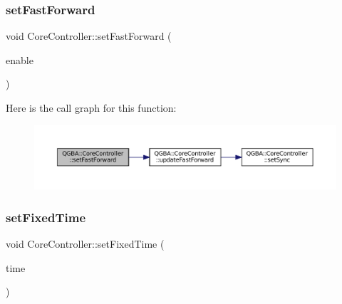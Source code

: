 \mbox{\label{class_q_g_b_a_1_1_core_controller_a44bec31b90546780c11957242878af56}} 
\subsubsection{\texorpdfstring{set\+Fast\+Forward}{setFastForward}}
{\footnotesize\ttfamily void Core\+Controller\+::set\+Fast\+Forward (\begin{DoxyParamCaption}\item[{\mbox{\hyperlink{libretro_8h_a4a26dcae73fb7e1528214a068aca317e}{bool}}}]{enable }\end{DoxyParamCaption})\hspace{0.3cm}{\ttfamily [slot]}}

Here is the call graph for this function\+:
\nopagebreak
\begin{figure}[H]
\begin{center}
\leavevmode
\includegraphics[width=350pt]{class_q_g_b_a_1_1_core_controller_a44bec31b90546780c11957242878af56_cgraph}
\end{center}
\end{figure}
\mbox{\label{class_q_g_b_a_1_1_core_controller_a6c5ba857cabaa2042dafe331edda5801}} 
\subsubsection{\texorpdfstring{set\+Fixed\+Time}{setFixedTime}}
{\footnotesize\ttfamily void Core\+Controller\+::set\+Fixed\+Time (\begin{DoxyParamCaption}\item[{const Q\+Date\+Time \&}]{time }\end{DoxyParamCaption})\hspace{0.3cm}{\ttfamily [slot]}}

